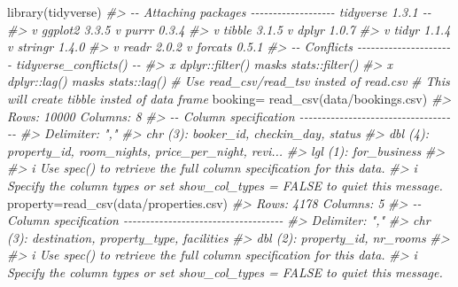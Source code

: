 \documentclass[
]{article}
\newenvironment{Shaded}{\begin{snugshade}}{\end{snugshade}}
\newcommand{\CommentTok}[1]{\textcolor[rgb]{0.56,0.35,0.01}{\textit{#1}}}
\newcommand{\FunctionTok}[1]{\textcolor[rgb]{0.00,0.00,0.00}{#1}}
\newcommand{\NormalTok}[1]{#1}
\newcommand{\OtherTok}[1]{\textcolor[rgb]{0.56,0.35,0.01}{#1}}
\newcommand{\StringTok}[1]{\textcolor[rgb]{0.31,0.60,0.02}{#1}}
\begin{document}
\begin{Shaded}
\begin{Highlighting}[]
\FunctionTok{library}\NormalTok{(tidyverse)}
\CommentTok{\#\textgreater{} {-}{-} Attaching packages {-}{-}{-}{-}{-}{-}{-}{-}{-}{-}{-}{-}{-}{-}{-}{-}{-}{-}{-} tidyverse 1.3.1 {-}{-}}
\CommentTok{\#\textgreater{} v ggplot2 3.3.5     v purrr   0.3.4}
\CommentTok{\#\textgreater{} v tibble  3.1.5     v dplyr   1.0.7}
\CommentTok{\#\textgreater{} v tidyr   1.1.4     v stringr 1.4.0}
\CommentTok{\#\textgreater{} v readr   2.0.2     v forcats 0.5.1}
\CommentTok{\#\textgreater{} {-}{-} Conflicts {-}{-}{-}{-}{-}{-}{-}{-}{-}{-}{-}{-}{-}{-}{-}{-}{-}{-}{-}{-}{-}{-} tidyverse\_conflicts() {-}{-}}
\CommentTok{\#\textgreater{} x dplyr::filter() masks stats::filter()}
\CommentTok{\#\textgreater{} x dplyr::lag()    masks stats::lag()}
\CommentTok{\# Use read\_csv/read\_tsv insted of read.csv}
\CommentTok{\# This will create tibble insted of data frame}
\NormalTok{booking}\OtherTok{=} \FunctionTok{read\_csv}\NormalTok{(}\StringTok{\textquotesingle{}data/bookings.csv\textquotesingle{}}\NormalTok{)}
\CommentTok{\#\textgreater{} Rows: 10000 Columns: 8}
\CommentTok{\#\textgreater{} {-}{-} Column specification {-}{-}{-}{-}{-}{-}{-}{-}{-}{-}{-}{-}{-}{-}{-}{-}{-}{-}{-}{-}{-}{-}{-}{-}{-}{-}{-}{-}{-}{-}{-}{-}{-}{-}{-}{-}}
\CommentTok{\#\textgreater{} Delimiter: ","}
\CommentTok{\#\textgreater{} chr (3): booker\_id, checkin\_day, status}
\CommentTok{\#\textgreater{} dbl (4): property\_id, room\_nights, price\_per\_night, revi...}
\CommentTok{\#\textgreater{} lgl (1): for\_business}
\CommentTok{\#\textgreater{} }
\CommentTok{\#\textgreater{} i Use \textasciigrave{}spec()\textasciigrave{} to retrieve the full column specification for this data.}
\CommentTok{\#\textgreater{} i Specify the column types or set \textasciigrave{}show\_col\_types = FALSE\textasciigrave{} to quiet this message.}
\NormalTok{property}\OtherTok{=}\FunctionTok{read\_csv}\NormalTok{(}\StringTok{\textquotesingle{}data/properties.csv\textquotesingle{}}\NormalTok{)}
\CommentTok{\#\textgreater{} Rows: 4178 Columns: 5}
\CommentTok{\#\textgreater{} {-}{-} Column specification {-}{-}{-}{-}{-}{-}{-}{-}{-}{-}{-}{-}{-}{-}{-}{-}{-}{-}{-}{-}{-}{-}{-}{-}{-}{-}{-}{-}{-}{-}{-}{-}{-}{-}{-}{-}}
\CommentTok{\#\textgreater{} Delimiter: ","}
\CommentTok{\#\textgreater{} chr (3): destination, property\_type, facilities}
\CommentTok{\#\textgreater{} dbl (2): property\_id, nr\_rooms}
\CommentTok{\#\textgreater{} }
\CommentTok{\#\textgreater{} i Use \textasciigrave{}spec()\textasciigrave{} to retrieve the full column specification for this data.}
\CommentTok{\#\textgreater{} i Specify the column types or set \textasciigrave{}show\_col\_types = FALSE\textasciigrave{} to quiet this message.}


\end{Highlighting}
\end{Shaded}
\end{document}
